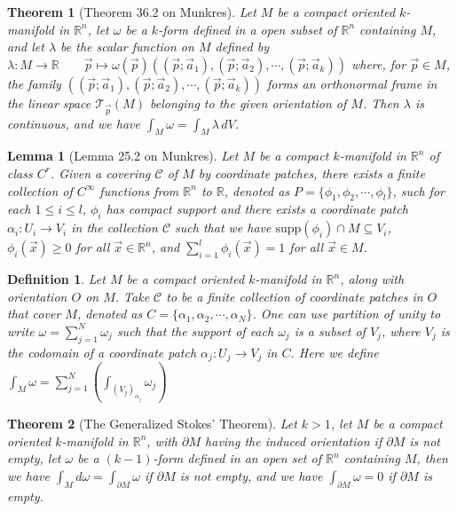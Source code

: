 \documentclass[9pt]{article}
\theoremstyle{break}
\theoremstyle{break}
\newtheorem{thm}{Theorem}[section]
\newtheorem{lem}{Lemma}[thm]
\newtheorem{defn}{Definition}[corL]
\newcommand{\R}{\mathbb{R}}
\newcommand{\T}{\mathcal{T}}
\newcommand{\C}{\mathcal{C}}
\begin{document}
\begin{thm}[Theorem 36.2 on Munkres]
Let $M$ be a compact oriented $k$-manifold in $\R^n$, let $\omega$ be a $k$-form defined in a open subset of $\R^n$ containing $M$, and let $\lambda$ be the scalar function on $M$ defined by $\lambda:M \to \R \qquad \vec{p}\mapsto \omega(\vec{p})((\vec{p};\vec{a}_1),(\vec{p};\vec{a}_2),\cdots, (\vec{p};\vec{a}_k))$ where, for $\vec{p}\in M$, the family $((\vec{p};\vec{a}_1),(\vec{p};\vec{a}_2),\cdots, (\vec{p};\vec{a}_k))$ forms an orthonormal frame in the linear space $\T_{\vec{p}}(M)$ belonging to the given orientation of $M$. Then $\lambda$ is continuous, and we have $\int_M \omega = \int_M \lambda \, dV$.
\end{thm}

\begin{lem}[Lemma 25.2 on Munkres]
Let $M$ be a compact $k$-manifold in $\R^n$ of class $C^r$. Given a covering $\mathcal{C}$ of $M$ by coordinate patches, there exists a finite collection of $C^\infty$ functions from $\R^n$ to $\R$, denoted as $P = \{ \phi_1, \phi_2,\cdots, \phi_l\}$, such for each $1\leq i\leq l$, $\phi_i$ has compact support and there exists a coordinate patch $\alpha_i : U_i \to V_i$ in the collection $\C$ such that we have $\text{supp}(\phi_i) \cap M \subseteq V_i$, $\phi_i(\vec{x})\geq 0$ for all $\vec{x} \in \R^n$, and $\sum_{i=1}^l \phi_i(\vec{x}) = 1$ for all $\vec{x}\in M$.
\end{lem}


\begin{defn}
Let $M$ be a compact oriented $k$-manifold in $\R^n$, along with orientation $O$ on $M$. Take $\C$ to be a finite collection of coordinate patches in $O$ that cover $M$, denoted as $C = \{ \alpha_1, \alpha_2,\cdots, \alpha_N\}$. One can use partition of unity to write $\omega = \sum_{j=1}^N\omega_j $ such that the support of each $\omega_j$ is a subset of $V_j$, where $V_j$ is the codomain of a coordinate patch $\alpha_j: U_j \to V_j$ in $C$. Here we define $\int_M \omega = \sum_{j=1}^N (\int_{(V_j)_{\alpha_j}}\omega_j )$
\end{defn}

\begin{thm}[The Generalized Stokes' Theorem]
Let $k>1$, let $M$ be a compact oriented $k$-manifold in $\R^n$, with $\partial M$ having the induced orientation if $\partial M$ is not empty, let $\omega$ be a $(k-1)$-form defined in an open set of $\R^n$ containing $M$, then we have $\int_M d\omega  = \int_{\partial M}\omega$ if $\partial M$ is not empty, and we have $
\int_{\partial M}\omega = 0$ if $\partial M$ is empty.
\end{thm}
\end{document}
